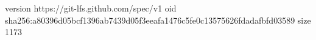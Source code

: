 version https://git-lfs.github.com/spec/v1
oid sha256:a80396d05bcf1396ab7439d05f3eeafa1476c5fe0c13575626fdadafbfd03589
size 1173
